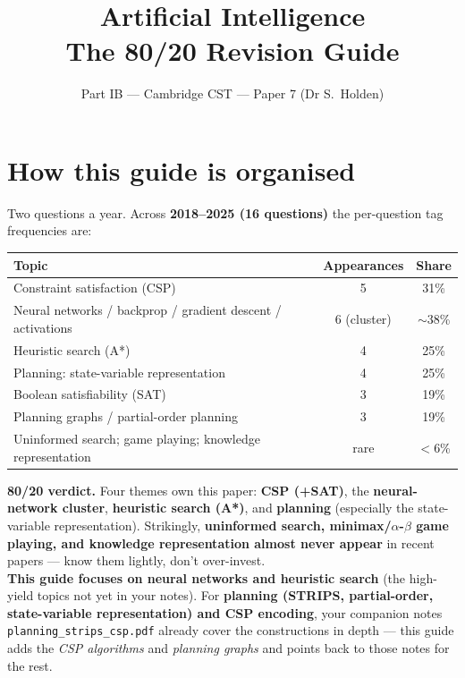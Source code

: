 \documentclass[11pt,a4paper]{article}
\title{\vspace{-1.5cm}\textbf{Artificial Intelligence} \\[2pt] \large The 80/20 Revision Guide}
\author{\small Part IB --- Cambridge CST --- Paper 7 (Dr S.\ Holden)}
\date{}
\begin{document}
\maketitle
\vspace{-0.8cm}

\section*{How this guide is organised}

Two questions a year. Across \textbf{2018--2025 (16 questions)} the per-question tag frequencies are:

\begin{center}
\begin{tabular}{lcc}
\hline
\textbf{Topic} & \textbf{Appearances} & \textbf{Share} \\
\hline
Constraint satisfaction (CSP) & 5 & 31\% \\
Neural networks / backprop / gradient descent / activations & 6 (cluster) & $\sim$38\% \\
Heuristic search (A*) & 4 & 25\% \\
Planning: state-variable representation & 4 & 25\% \\
Boolean satisfiability (SAT) & 3 & 19\% \\
Planning graphs / partial-order planning & 3 & 19\% \\
Uninformed search; game playing; knowledge representation & rare & $<$6\% \\
\hline
\end{tabular}
\end{center}

\textbf{80/20 verdict.} Four themes own this paper: \textbf{CSP (+SAT)}, the \textbf{neural-network cluster}, \textbf{heuristic search (A*)}, and \textbf{planning} (especially the state-variable representation). Strikingly, \textbf{uninformed search, minimax/$\alpha$-$\beta$ game playing, and knowledge representation almost never appear} in recent papers --- know them lightly, don't over-invest.\\[2pt]
\textbf{This guide focuses on neural networks and heuristic search} (the high-yield topics not yet in your notes). For \textbf{planning (STRIPS, partial-order, state-variable representation) and CSP encoding}, your companion notes \texttt{planning\_strips\_csp.pdf} already cover the constructions in depth --- this guide adds the \emph{CSP algorithms} and \emph{planning graphs} and points back to those notes for the rest.
\end{document}
